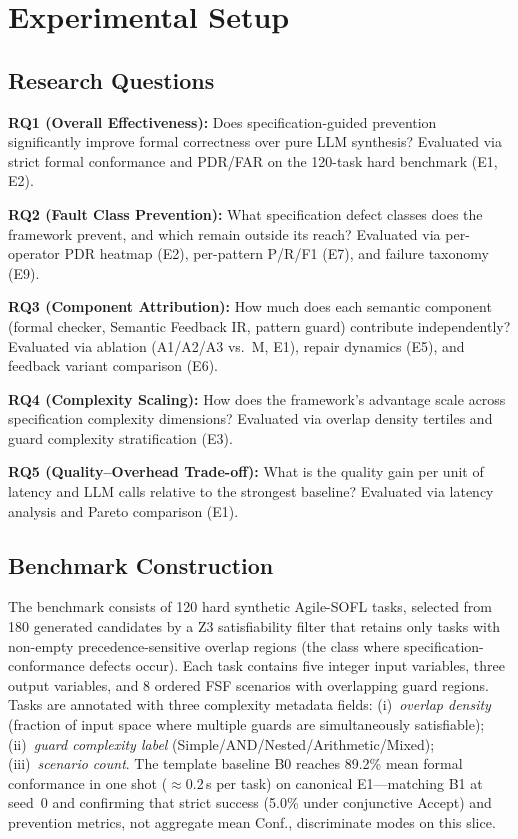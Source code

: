 \section{Experimental Setup}
\label{sec:setup}

\subsection{Research Questions}

\textbf{RQ1 (Overall Effectiveness):}
Does specification-guided prevention significantly improve formal correctness over pure
LLM synthesis?
Evaluated via strict formal conformance and PDR/FAR on the 120-task hard benchmark
(E1, E2).

\textbf{RQ2 (Fault Class Prevention):}
What specification defect classes does the framework prevent, and which remain outside
its reach?
Evaluated via per-operator PDR heatmap (E2), per-pattern P/R/F1 (E7), and failure
taxonomy (E9).

\textbf{RQ3 (Component Attribution):}
How much does each semantic component (formal checker, Semantic Feedback IR, pattern
guard) contribute independently?
Evaluated via ablation (A1/A2/A3 vs.\ M, E1), repair dynamics (E5), and feedback
variant comparison (E6).

\textbf{RQ4 (Complexity Scaling):}
How does the framework's advantage scale across specification complexity dimensions?
Evaluated via overlap density tertiles and guard complexity stratification (E3).

\textbf{RQ5 (Quality--Overhead Trade-off):}
What is the quality gain per unit of latency and LLM calls relative to the strongest
baseline?
Evaluated via latency analysis and Pareto comparison (E1).

\subsection{Benchmark Construction}

The benchmark consists of 120 hard synthetic Agile-SOFL tasks, selected from 180
generated candidates by a Z3 satisfiability filter that retains only tasks with
non-empty precedence-sensitive overlap regions (the class where
specification-conformance defects occur).
Each task contains five integer input variables, three output variables, and 8 ordered
FSF scenarios with overlapping guard regions.
Tasks are annotated with three complexity metadata fields: (i)~\emph{overlap density}
(fraction of input space where multiple guards are simultaneously satisfiable);
(ii)~\emph{guard complexity label} (Simple/AND/Nested/Arithmetic/Mixed);
(iii)~\emph{scenario count}.
The template baseline B0 reaches 89.2\% mean formal conformance in one shot
($\approx$0.2\,s per task) on canonical E1---matching B1 at seed~0 and
confirming that strict success (5.0\% under conjunctive Accept) and
prevention metrics, not aggregate mean Conf., discriminate modes on this slice.

